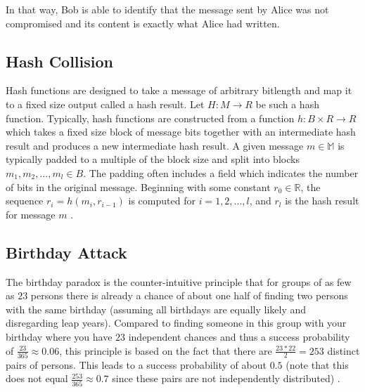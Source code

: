 \documentclass[12pt]{article}
\begin{document}
In that way, Bob is able to identify that the message sent by Alice was not compromised and its content
is exactly what Alice had written.

\subsection{Hash Collision}

Hash functions are designed to take a message of arbitrary bitlength and map it to a fixed size
output called a hash result. Let \(H : M \to R\) be such a hash function. Typically, 
hash functions are constructed from a function \(h: B \times R \to R\) which takes a fixed size block 
of message bits together with an intermediate hash result and produces a new intermediate hash result. 
A given message \(m \in \mathbb{M}\) is typically padded to a multiple of the block size and split 
into blocks \(m_1, m_2, ... , m_l \in B\). The padding often includes a field which indicates the 
number of bits in the original message. Beginning with some constant \(r_0 \in \mathbb{R}\), the sequence 
\(r_i = h(m_i, r_{i-1})\) is computed for \(i = 1, 2, ... , l\), and \(r_l\) is the hash result for message 
\(m\) \cite{van1999parallel}.

\subsection{Birthday Attack}

The birthday paradox is the counter-intuitive principle that for
groups of as few as \(23\) persons there is already a chance of about one half of finding two 
persons with the same birthday (assuming all birthdays are equally likely and disregarding 
leap years). Compared to finding someone in this group with your birthday where you have 
\(23\) independent chances and thus a success probability of \(\frac{23}{365} \approx 0.06\), this principle is 
based on the fact that there are \(\frac{23 * 22}{2} = 253\) distinct pairs of persons. This leads to 
a success probability of about \(0.5\) (note that this does not equal \(\frac{253}{365} \approx 0.7\) since these 
pairs are not independently distributed) \cite{stevens2012attacks}.
\end{document}
